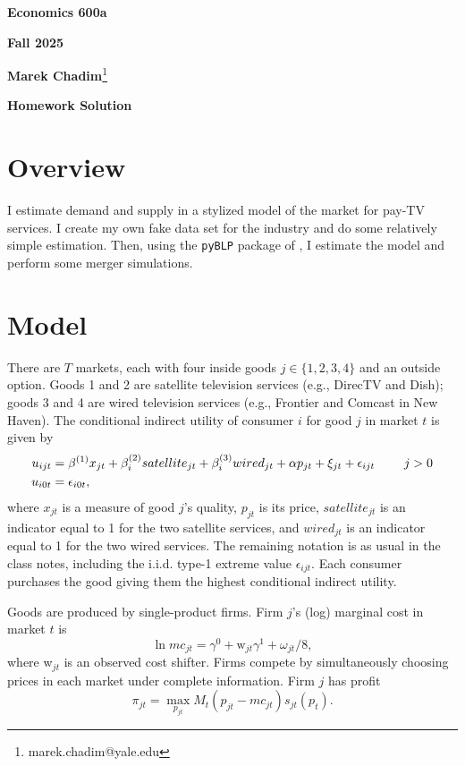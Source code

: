 \documentclass[english,11pt]{article}
\begin{document}
\begin{center}
\textbf{Economics 600a}

\textbf{Fall 2025}

\textbf{Marek Chadim}\footnote[1]{marek.chadim@yale.edu}

\textbf{Homework Solution}

\end{center}

\bigskip

\section{Overview}

I estimate demand and supply in a stylized model of the market for pay-TV services.
I create my own fake data set
for the industry and do some relatively simple estimation. Then, using the \texttt{pyBLP} package of \citet{conlon2020pyblp}, I estimate the model and perform some merger simulations.

\section{Model}

There are $T$ markets, each with four inside goods $j\in
\{1,2,3,4\}$ and an outside option. Goods 1 and 2 are satellite television
services (e.g., DirecTV and Dish); goods 3 and 4 are wired television
services (e.g., Frontier and Comcast in New Haven).
The conditional indirect utility of consumer $i$ for good $j$ in market $t$
is given by
\begin{align*}
u_{ijt}& =\beta ^{\left( 1\right) }x_{jt}+\beta
_{i}^{(2)}satellite_{jt}+\beta _{i}^{(3)}wired_{jt}+\alpha p_{jt}+\xi
_{jt}+\epsilon _{ijt}\text{ \qquad }j>0 \\
u_{i0t}& =\epsilon _{i0t},
\end{align*}%
where $x_{jt}$ is a measure of good $j$'s quality, $p_{jt}$ is its price, $%
satellite_{jt}$ is an indicator equal to 1 for the two satellite services,
and $wired_{jt}$ is an indicator equal to 1 for the two wired services. The
remaining notation is as usual in the class notes, including the i.i.d.
type-1 extreme value $\epsilon _{ijt}$.  Each consumer purchases the good giving them the highest conditional indirect utility.

Goods are produced by single-product firms. Firm $j$'s (log) marginal
cost in market $t$ is 
\begin{equation*}
\ln mc_{jt}=\gamma ^{0}+\text{w}_{jt}\gamma ^{1}+\omega _{jt}/8,
\end{equation*}%
where w$_{jt}$ is an observed cost shifter. Firms compete by simultaneously choosing prices in each market under complete information. Firm $j$ has profit
\begin{equation*}
\pi _{jt}=\max_{p_{jt}}M_{t}(p_{jt}-mc_{jt})s_{jt}(p_{t}).
\end{equation*}
\end{document}
